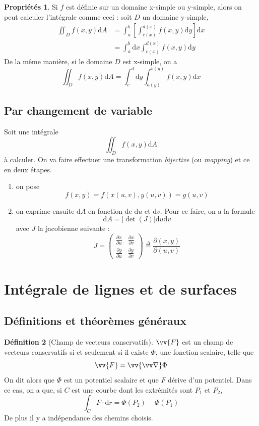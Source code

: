 \documentclass[11pt,a4paper]{article}
\theoremstyle{definition}
\newtheorem{mydef}{Définition}[section]
\newtheorem{myprop}[mydef]{Propriétés}
\DeclareMathOperator{\newdet}{det}
\newcommand{\dif}{\mathrm{d}}
\let\oldnabla\nabla
\renewcommand{\nabla}{\vv{\oldnabla}}
\newcommand{\pa}{\partial}
\begin{document}
\begin{myprop} Si $f$ est définie sur un domaine x-simple ou y-simple, alors on peut calculer l'intégrale comme ceci : soit $D$ un domaine y-simple,
\begin{align*} \iint_D f(x,y)\dif A & = \int_a^b \left[ \int_{c(x)}^{d(x)} f(x,y) \dif y \right] \dif x \\
																		& = \int_a^b \dif x \int_{c(x)}^{d(x)} f(x,y) \dif y \end{align*}
De la même manière, si le domaine $D$ est x-simple, on a
\[ \iint_D f(x,y)\dif A  = \int_c^d \dif y \int_{a(y)}^{b(y)} f(x,y) \dif x \]
\end{myprop}

\subsection{Par changement de variable}
Soit une intégrale
\[ \iint_D f(x,y) \dif A \]
à calculer. On va faire effectuer une transformation \emph{bijective} (ou \emph{mapping}) et ce en deux étapes.
\begin{enumerate}
\item on pose
\[ f(x,y) = f(x(u,v),y(u,v)) = g(u,v) \]
\item on exprime ensuite $\dif A$ en fonction de $\dif u$ et $\dif v$. Pour ce faire, on a la formule
\[ \dif A = |\newdet(J)| \dif u \dif v \]
avec $J$ la jacobienne suivante :
\[ J = \begin{pmatrix} \frac{\pa x}{\pa u} & \frac{\pa x}{\pa v} \\ \frac{\pa y}{\pa u} & \frac{\pa y}{\pa v} \end{pmatrix} \overset{\Delta}{=} \frac{\pa(x,y)}{\pa (u,v)} \]
\end{enumerate}

\section{Intégrale de lignes et de surfaces}

\subsection{Définitions et théorèmes généraux}

\begin{mydef}[Champ de vecteurs conservatifs] $\vv{F}$ est un champ de vecteurs conservatifs si et seulement si il existe $\Phi$, une fonction scalaire, telle que
\[ \vv{F} = \nabla \Phi \]
On dit alors que $\Phi$ est un potentiel scalaire et que $F$ dérive d'un potentiel.
Dans ce cas, on a que, si $C$ est une courbe dont les extrémités sont $P_1$ et $P_2$,
\[ \int_C F \cdot \dif r = \Phi(P_2) - \Phi(P_1) \]
De plus il y a indépendance des chemins choisis.
\end{mydef}
\end{document}
